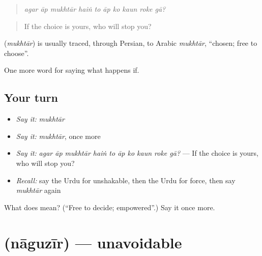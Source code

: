 \begin{quote}
         
\end{quote}

\begin{quote}
\emph{agar āp mukhtār haiṅ to āp ko kaun roke gā?}
\end{quote}

\begin{quote}
If the choice is yours, who will stop you?
\end{quote}

\begin{cousinweb}
\textbf{} (\emph{mukhtār}) is usually traced, through Persian, to Arabic \emph{mukhtār}, \textquotedblleft{}chosen; free to choose\textquotedblright{}.
\end{cousinweb}

\begin{grammarlens}[title={What you've built}]
One more word for saying what happens if.
\end{grammarlens}

\subsection*{Your turn}
\begin{itemize}
\raggedright
  \item \emph{Say it:} \emph{mukhtār}
  \item \emph{Say it:} \emph{mukhtār}, once more
  \item \emph{Say it:} \emph{agar āp mukhtār haiṅ to āp ko kaun roke gā?} — If the choice is yours, who will stop you?
  \item \emph{Recall:} say the Urdu for unshakable, then the Urdu for force, then say \emph{mukhtār} again
\end{itemize}

\begin{tcolorbox}[breakable,colback=teal!4,colframe=teal!35!black,title={Before you move on}]
What does  mean? (\textquotedblleft{}Free to decide; empowered\textquotedblright{}.) Say it once more.
\end{tcolorbox}
\section[\texorpdfstring{\ur{ناگزیر} (nāguzīr)}{ناگزیر (nāguzīr)}]{ (nāguzīr) — unavoidable}

\label{lesson:UR-C539-naguzir}



